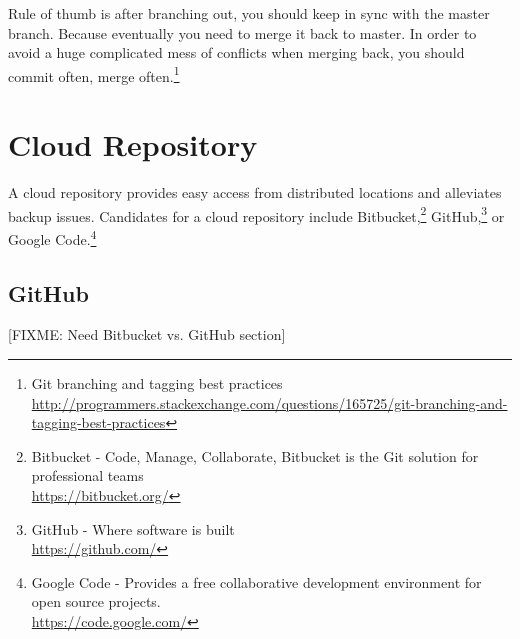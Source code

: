 \documentclass[12pt,letterpaper,dvips]{article}
\newcommand{\FIXME}[1]{\textsf{[FIXME: #1]}}
\begin{document}
\noindent Rule of thumb is after branching out, you should keep in sync with
the master branch. Because eventually you need to merge it back to master. In
order to avoid a huge complicated mess of conflicts when merging back, you
should commit often, merge often.\footnote{Git branching and tagging best
practices\\
\href{http://programmers.stackexchange.com/questions/165725/git-branching-and-tagging-best-practices}{http://programmers.stackexchange.com/questions/165725/git-branching-and-tagging-best-practices}}


\newpage
\section{Cloud Repository}
A cloud repository provides easy access from distributed
locations and alleviates backup issues.  Candidates for
a cloud repository include Bitbucket,\footnote{Bitbucket - Code, Manage, Collaborate,
Bitbucket is the Git solution for professional teams\\
\href{https://bitbucket.org/}{https://bitbucket.org/}}
GitHub,\footnote{GitHub - Where software is built\\
\href{https://github.com/}{https://github.com/}}
or Google Code.\footnote{Google Code - Provides a free collaborative development environment
for open source projects.\\
\href{https://code.google.com/}{https://code.google.com/}}


\subsection{GitHub}


\FIXME{Need Bitbucket vs. GitHub section}





\newpage
\end{document}
